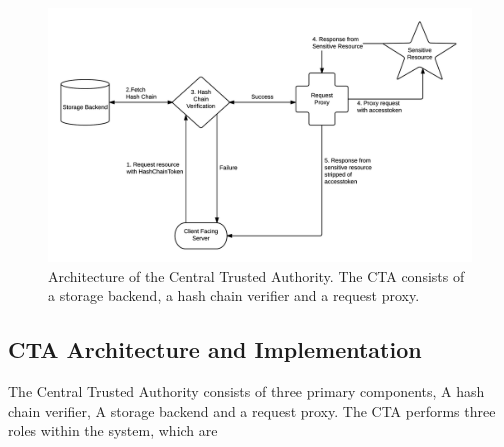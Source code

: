 \documentclass[a4paper,twoside]{article}
\begin{document}
\begin{figure}[!ht]
  \centering
  \includegraphics[keepaspectratio=true,scale=0.75]{cta_architecture}
  \caption{Architecture of the Central Trusted Authority. The CTA consists of a storage backend, a hash chain verifier and a request proxy.}
  \label{fig:ctaarchitecture}
\end{figure}

%
%
%
%


\subsection{CTA Architecture and Implementation} \label{sec:cta-architecture}

The Central Trusted Authority consists of three primary components, A hash chain verifier, A storage backend and a request proxy. The CTA performs three roles within the system, which are
\end{document}
